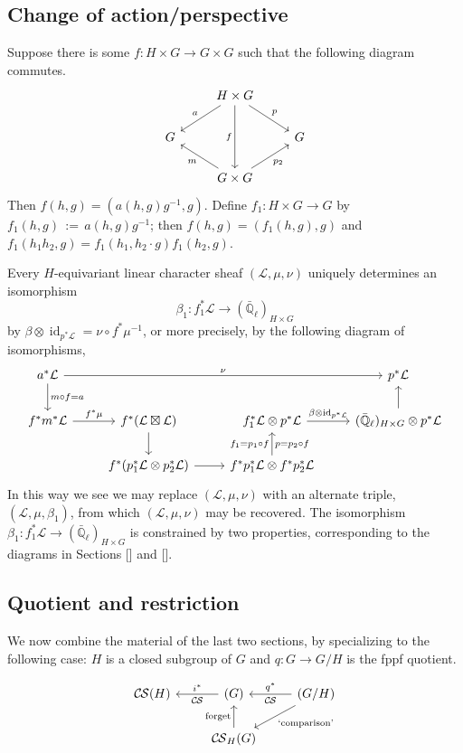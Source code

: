 \documentclass[10pt]{amsart}
\theoremstyle{plain}
\theoremstyle{definition}
\newcommand{\EE}{\mathbb{\bar Q}_\ell}
\DeclareMathOperator{\id}{id}
\newcommand{\ceq}{{\, :=\, }}
\newcommand{\cs}[1]{{\mathcal{#1}}}
\newcommand{\CS}{{\mathcal{C\hskip-0.8pt S}}}
\begin{document}
\subsection{Change of action/perspective}

Suppose there is some $f : H\times G\to G\times G$ such that the following diagram commutes.
\[
\begin{tikzcd}
\ &  \arrow{dl}[swap]{a} H \times G \arrow{dr}{p} \arrow{dd}[swap]{f} & \\
G & & G \\
& \arrow{ul}{m} G \times G \arrow{ur}[swap]{p_2} & 
\end{tikzcd}
\]
Then $f(h,g) = (a(h,g) g^{-1}, g)$.
Define $f_1: H\times G \to G$ by $f_1(h,g)\ceq a(h,g) g^{-1}$; then $f(h,g) = (f_1(h,g),g)$ and $f_1(h_1 h_2,g) = f_1(h_1, h_2\cdot g) f_1(h_2,g)$.

Every $H$-equivariant linear character sheaf $(\cs{L},\mu, \nu)$ uniquely determines an isomorphism 
\[
\beta_1 : f_1^*\cs{L} \to (\EE)_{H\times G}
\]
by $\beta \otimes \id_{p^*\cs{L}} = \nu \circ f^*\mu^{-1}$, or more precisely, by the following diagram of isomorphisms,
\[
\begin{tikzcd}
a^*\cs{L} \arrow{d}{m\circ f = a} \arrow{rrr}{\nu}
&&& p^*\cs{L}\\
f^* m^*\cs{L} \arrow{r}{f^*\mu} & 
f^*(\cs{L}\boxtimes \cs{L}) \arrow{d} & 
f_1^*\cs{L} \otimes p^*\cs{L} \arrow{r}{\beta\otimes \id_{p^*\cs{L}}} & 
(\EE)_{H\times G} \otimes p^*\cs{L} \arrow{u} \\
& f^*(p_1^*\cs{L}\otimes p_2^*\cs{L}) \arrow{r} & f^*p_1^*\cs{L}\otimes f^* p_2^*\cs{L} \arrow{u}{f_1 = p_1\circ f}[swap]{p = p_2\circ f} &
\end{tikzcd}
\]
In this way we see we may replace $(\cs{L},\mu,\nu)$ with an alternate triple, $(\cs{L},\mu,\beta_1)$, from which $(\cs{L},\mu,\nu)$ may be recovered.
The isomorphism $\beta_1 : f_1^*\cs{L} \to (\EE)_{H\times G}$ is constrained by two properties, corresponding to the diagrams in Sections [] and [].

\subsection{Quotient and restriction}

We now combine the material of the last two sections, by specializing to the following case: $H$ is a closed subgroup of $G$ and $q : G \to G/H$ is the fppf quotient.

\[
\begin{tikzcd}
\CS(H) & \arrow{l}[swap]{i^*} \CS(G) &\arrow{l}[swap]{q^*} 
\CS(G/H) \arrow{dl}{\text{`comparison'}} \\
 & \CS_{H}(G) \arrow{u}{\text{forget}}  & 
\end{tikzcd}
\]
\end{document}

